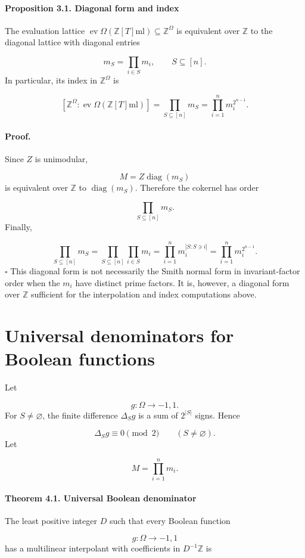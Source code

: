 \documentclass[11pt]{article}
\theoremstyle{definition}
\begin{document}
\paragraph{Proposition 3.1. Diagonal form and index}
The evaluation lattice $\operatorname{ev}\Omega(\mathbb{Z}[T]{\mathrm{ml}})\subseteq\mathbb{Z}^\Omega$ is equivalent over $\mathbb{Z}$ to the diagonal lattice with diagonal entries

\[
m_S=\prod_{i\in S}m_i,
\qquad S\subseteq[n].
\]
In particular, its index in $\mathbb{Z}^\Omega$ is

\[
[\mathbb{Z}^\Omega:\operatorname{ev}\Omega(\mathbb{Z}[T]{\mathrm{ml}})]
=
\prod_{S\subseteq[n]}m_S
=
\prod_{i=1}^n m_i^{2^{n-1}}.
\]
\paragraph{Proof.}
Since $Z$ is unimodular,

\[
M=Z\operatorname{diag}(m_S)
\]
is equivalent over $\mathbb{Z}$ to $\operatorname{diag}(m_S)$. Therefore the cokernel has order

\[
\prod_{S\subseteq[n]}m_S.
\]
Finally,

\[
\prod_{S\subseteq[n]}m_S
=
\prod_{S\subseteq[n]}\prod_{i\in S}m_i
=
\prod_{i=1}^n m_i^{|{S:S\ni i}|}
=
\prod_{i=1}^n m_i^{2^{n-1}}.
\]
\(\square\)
This diagonal form is not necessarily the Smith normal form in invariant-factor order when the $m_i$ have distinct prime factors. It is, however, a diagonal form over $\mathbb{Z}$ sufficient for the interpolation and index computations above.

\section{Universal denominators for Boolean functions}
Let

\[
g:\Omega\to{-1,1}.
\]
For $S\ne\varnothing$, the finite difference $\Delta_Sg$ is a sum of $2^{|S|}$ signs. Hence

\[
\Delta_Sg
\equiv 0\pmod2
\qquad(S\ne\varnothing).
\]
Let

\[
M=\prod_{i=1}^n m_i.
\]
\paragraph{Theorem 4.1. Universal Boolean denominator}
The least positive integer $D$ such that every Boolean function

\[
g:\Omega\to{-1,1}
\]
has a multilinear interpolant with coefficients in $D^{-1}\mathbb{Z}$ is
\end{document}
